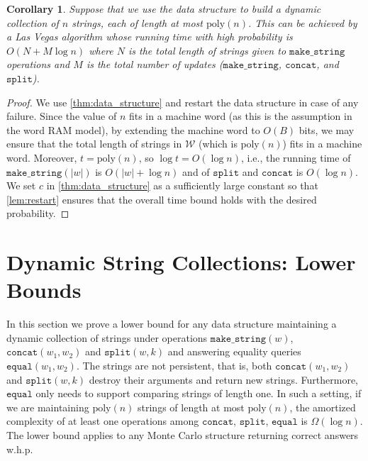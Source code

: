\documentclass[a4paper]{article}
\newtheorem{corollary}[theorem]{Corollary}
\theoremstyle{remark}
\newcommand{\makeop}{\mathtt{make\_string}}
\newcommand{\eqop}{\mathtt{equal}}
\newcommand{\concop}{\mathtt{concat}}
\newcommand{\splitop}{\mathtt{split}}
\newcommand{\coll}{\mathcal{W}}
\newcommand{\poly}{\mathrm{poly}}
\begin{document}
\begin{corollary}\label{cor:persistent}
Suppose that we use the data structure to build  a dynamic collection of $n$ strings, each of length at most $\poly(n)$.
This can be achieved by a Las Vegas algorithm whose running time with high probability is $O(N+M\log n)$ where $N$
is the total length of strings given to $\makeop$ operations and $M$ is the total number of updates ($\makeop$, $\concop$, and $\splitop$).
\end{corollary}

\begin{proof}
We use \cref{thm:data_structure} and restart the data structure in case of any failure.
Since the value of $n$ fits in a machine word (as this is the assumption in the word RAM model),
by extending the machine word to $O(B)$ bits, we may ensure that the total length of strings in $\coll$ (which is $\poly(n)$)
fits in a machine word.  Moreover, $t=\poly(n)$, so $\log t=O(\log n)$, i.e., the running time of $\makeop(|w|)$ is $O(|w|+\log n)$
and of $\splitop$ and $\concop$ is $O(\log n)$.
We set $c$ in \cref{thm:data_structure} as a sufficiently large constant
so that \cref{lem:restart} ensures that the overall time bound holds with the desired probability.
\end{proof}

\section{Dynamic String Collections: Lower Bounds}\label{sec:lb}

In this section we prove a lower bound for any data structure maintaining a dynamic collection
of strings under operations $\makeop(w)$, $\concop(w_1,w_2)$ and $\splitop(w,k)$ and
answering equality queries $\eqop(w_1,w_2)$. The strings are not persistent, that is, both $\concop(w_1,w_2)$
and $\splitop(w,k)$ destroy their arguments and return new strings. Furthermore,
$\eqop$ only needs to support comparing strings of length one.
In such a setting, if we are maintaining $\poly(n)$ strings of length at most $\poly(n)$,
the amortized complexity of at least one operations among $\concop$, $\splitop$, $\eqop$ is
$\Omega(\log n)$. The lower bound applies to any Monte Carlo structure returning correct answers
w.h.p.
\end{document}
